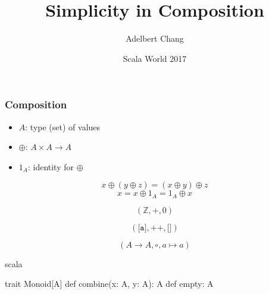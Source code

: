 \documentclass{beamer}
\title{Simplicity in Composition}
\author{Adelbert Chang}
\date{Scala World 2017}
\def\code#1{\texttt{#1}}
\newcommand{\gpause}{\vspace*{-\baselineskip}\pause}
\begin{document}
\frame{\titlepage}

\begin{frame}

  \frametitle{Composition}
  \large

  \begin{itemize}
    \item $A$: type (set) of values \pause
    \item $\oplus$: $A \times A \rightarrow A$ \pause
    \item $1_{A}$: identity for $\oplus$ \pause
  \end{itemize}

  $$x \oplus (y \oplus z) = (x \oplus y) \oplus z$$ \gpause
  $$x = x \oplus 1_{A} = 1_{A} \oplus x$$

\end{frame}

\begin{frame} \Large $$(\mathbb{Z}, +, 0)$$ \end{frame}

\begin{frame} \Large $$(\code{[a]}, +\!\!+, \code{[]})$$ \end{frame}

\begin{frame} \Large $$(A \rightarrow A, \circ, a \mapsto a)$$ \end{frame}

\begin{frame}[fragile]
  \large
  \centering

  \begin{cminted}{scala}

 trait Monoid[A] {
   def combine(x: A, y: A): A
   def empty: A
 }

  \end{cminted}

\end{frame}



\end{document}
